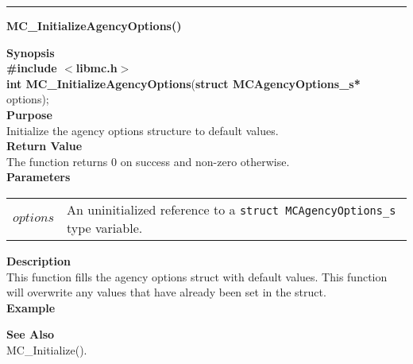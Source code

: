 \noindent
\vspace{5pt}
\rule{6.5in}{0.015in}
\noindent
{}
{\LARGE \bf MC\_InitializeAgencyOptions()}\\
\label{api:MC_InitializeAgencyOptions()}

\noindent
{\bf Synopsis}\\
{\bf \#include $<$libmc.h$>$}\\
{\bf int MC\_InitializeAgencyOptions}({\bf struct MCAgencyOptions\_s* } options);\\

\noindent
{\bf Purpose}\\
Initialize the agency options structure to default values. \\

\noindent
{\bf Return Value}\\
The function returns 0 on success and non-zero otherwise.\\

\noindent
{\bf Parameters}
\vspace{-0.1in}
\begin{description}
\item
\begin{tabular}{p{10 mm}p{145 mm}} 
$options$ & An uninitialized reference to a \texttt{struct MCAgencyOptions\_s} type variable.
\end{tabular}
\end{description}

\noindent
{\bf Description}\\
This function fills the agency options struct with default values. This
function will overwrite any values that have already been set in the
struct. \\

\noindent
{\bf Example}\\
\noindent
{\footnotesize}

\noindent
{\bf See Also}\\
MC\_Initialize().

